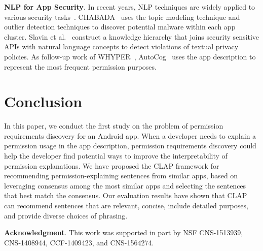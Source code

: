 \textbf{NLP for App Security}. In recent years, NLP techniques are widely applied to various security tasks~\cite{conf/icse/GorlaTGZ14,slavin2016toward}. CHABADA~\cite{conf/icse/GorlaTGZ14} uses the topic modeling technique and outlier detection techniques to discover potential malware within each app cluster. 
Slavin et al.~\cite{slavin2016toward} construct a knowledge hierarchy that joins security sensitive APIs with natural language concepts to detect violations of textual privacy policies. 
As follow-up work of WHYPER~\cite{conf/uss/PanditaXYEX13}, AutoCog~\cite{conf/ccs/QuRZCZC14} uses the app description to represent the most frequent permission purposes.



\section{Conclusion}
\label{sec:conclusion}

In this paper, we conduct the first study on the problem of permission requirements discovery for an Android app. 
When a developer needs to explain a permission usage in the app description, permission requirements discovery could help the developer find potential ways to improve the interpretability of permission explanations. 
We have proposed the CLAP framework for recommending  permission-explaining sentences from similar apps, based on  leveraging consensus among the most similar apps and selecting the sentences that best match the consensus. Our evaluation results have shown that CLAP can recommend sentences that are relevant, concise, include detailed purposes, and provide diverse choices of phrasing. 

\noindent \textbf{Acknowledgment}. This work was supported in part by NSF CNS-1513939, CNS-1408944,  CCF-1409423, and CNS-1564274. 
